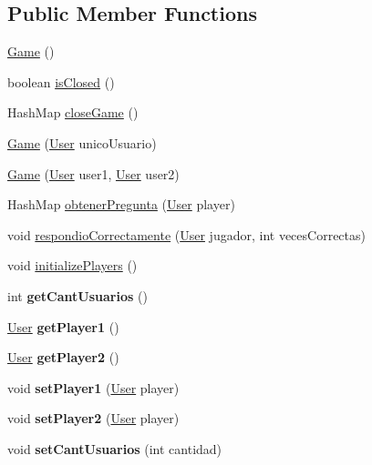 \subsection*{Public Member Functions}
\begin{DoxyCompactItemize}
\item 
\mbox{\hyperlink{classtrivia_1_1Game_ac0ed7c3b89cdb6936ada292648db5165}{Game}} ()
\item 
boolean \mbox{\hyperlink{classtrivia_1_1Game_a541c6b1a5cac82e7bc3ba39feccf22a7}{is\+Closed}} ()
\item 
Hash\+Map \mbox{\hyperlink{classtrivia_1_1Game_af7ae2d61676f50cea2d5cd07fe37713f}{close\+Game}} ()
\item 
\mbox{\hyperlink{classtrivia_1_1Game_a66e59862c017262e9294558a9e024cbe}{Game}} (\mbox{\hyperlink{classtrivia_1_1User}{User}} unico\+Usuario)
\item 
\mbox{\hyperlink{classtrivia_1_1Game_a03c33ebd51af0b2137101ac28e5b2536}{Game}} (\mbox{\hyperlink{classtrivia_1_1User}{User}} user1, \mbox{\hyperlink{classtrivia_1_1User}{User}} user2)
\item 
Hash\+Map \mbox{\hyperlink{classtrivia_1_1Game_a7b5d8f58e7646f91e21f0182d985960a}{obtener\+Pregunta}} (\mbox{\hyperlink{classtrivia_1_1User}{User}} player)
\item 
void \mbox{\hyperlink{classtrivia_1_1Game_ab5041f892c2f683775d09f2eee17e8d2}{respondio\+Correctamente}} (\mbox{\hyperlink{classtrivia_1_1User}{User}} jugador, int veces\+Correctas)
\item 
void \mbox{\hyperlink{classtrivia_1_1Game_a9cc89954f712f9423034b39cc0b13981}{initialize\+Players}} ()
\item 
\mbox{\label{classtrivia_1_1Game_a7ab103e6a0b31ede06021ab65a9cde31}} 
int {\bfseries get\+Cant\+Usuarios} ()
\item 
\mbox{\label{classtrivia_1_1Game_a011392205502ca7e6be98ac42b2647d3}} 
\mbox{\hyperlink{classtrivia_1_1User}{User}} {\bfseries get\+Player1} ()
\item 
\mbox{\label{classtrivia_1_1Game_a509143fb3810d089e542b241841d1a3e}} 
\mbox{\hyperlink{classtrivia_1_1User}{User}} {\bfseries get\+Player2} ()
\item 
\mbox{\label{classtrivia_1_1Game_afefdce3a9a90710fd816910d50679e6a}} 
void {\bfseries set\+Player1} (\mbox{\hyperlink{classtrivia_1_1User}{User}} player)
\item 
\mbox{\label{classtrivia_1_1Game_afcf7f65afe4042216dea76c9a95c49c4}} 
void {\bfseries set\+Player2} (\mbox{\hyperlink{classtrivia_1_1User}{User}} player)
\item 
\mbox{\label{classtrivia_1_1Game_a8bae3bf163c788ab952ea4d518203bde}} 
void {\bfseries set\+Cant\+Usuarios} (int cantidad)
\end{DoxyCompactItemize}
